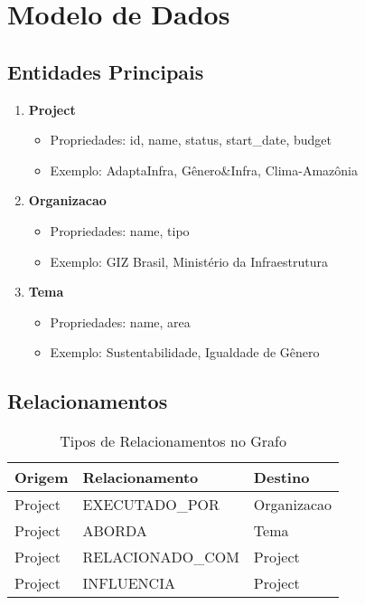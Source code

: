\documentclass[12pt,a4paper]{article}
\begin{document}
\section{Modelo de Dados}

\subsection{Entidades Principais}

\begin{enumerate}
    \item \textbf{Project}
    \begin{itemize}
        \item Propriedades: id, name, status, start\_date, budget
        \item Exemplo: AdaptaInfra, Gênero\&Infra, Clima-Amazônia
    \end{itemize}
    
    \item \textbf{Organizacao}
    \begin{itemize}
        \item Propriedades: name, tipo
        \item Exemplo: GIZ Brasil, Ministério da Infraestrutura
    \end{itemize}
    
    \item \textbf{Tema}
    \begin{itemize}
        \item Propriedades: name, area
        \item Exemplo: Sustentabilidade, Igualdade de Gênero
    \end{itemize}
\end{enumerate}

\subsection{Relacionamentos}

\begin{table}[h]
\centering
\begin{tabular}{@{}lll@{}}
\toprule
\textbf{Origem} & \textbf{Relacionamento} & \textbf{Destino} \\
\midrule
Project & EXECUTADO\_POR & Organizacao \\
Project & ABORDA & Tema \\
Project & RELACIONADO\_COM & Project \\
Project & INFLUENCIA & Project \\
\bottomrule
\end{tabular}
\caption{Tipos de Relacionamentos no Grafo}
\end{table}
\end{document}

